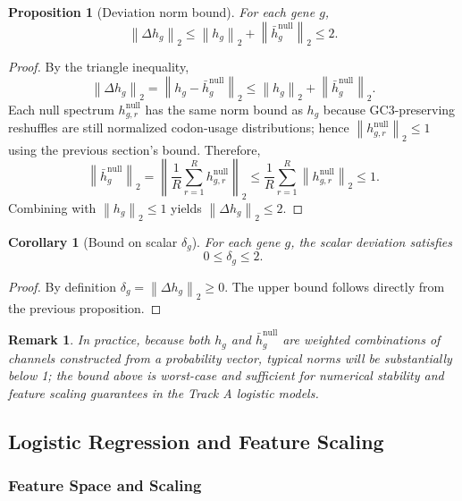 \documentclass[11pt]{article}
\newtheorem{proposition}[definition]{Proposition}
\newtheorem{corollary}[definition]{Corollary}
\newtheorem{remark}[definition]{Remark}
\newcommand{\norm}[1]{\left\lVert #1 \right\rVert}
\begin{document}
\begin{proposition}[Deviation norm bound]
For each gene \(g\),
\[
  \norm{\Delta h_g}_2 \le \norm{h_g}_2 + \norm{\bar{h}_g^{\mathrm{null}}}_2 \le 2.
\]
\end{proposition}

\begin{proof}
By the triangle inequality,
\[
  \norm{\Delta h_g}_2 = \norm{h_g - \bar{h}_g^{\mathrm{null}}}_2 \le \norm{h_g}_2 + \norm{\bar{h}_g^{\mathrm{null}}}_2.
\]
Each null spectrum \(h_{g,r}^{\mathrm{null}}\) has the same norm bound as \(h_g\) because GC3-preserving reshuffles are still normalized codon-usage distributions; hence \(\norm{h_{g,r}^{\mathrm{null}}}_2 \le 1\) using the previous section's bound.
Therefore,
\[
  \norm{\bar{h}_g^{\mathrm{null}}}_2 =
  \left\lVert \frac{1}{R} \sum_{r=1}^R h_{g,r}^{\mathrm{null}} \right\rVert_2
  \le \frac{1}{R} \sum_{r=1}^R \norm{h_{g,r}^{\mathrm{null}}}_2
  \le 1.
\]
Combining with \(\norm{h_g}_2 \le 1\) yields \(\norm{\Delta h_g}_2 \le 2\).
\end{proof}

\begin{corollary}[Bound on scalar \texorpdfstring{$\delta_g$}{δg}]
For each gene \(g\), the scalar deviation satisfies
\[
  0 \le \delta_g \le 2.
\]
\end{corollary}

\begin{proof}
By definition \(\delta_g = \norm{\Delta h_g}_2 \ge 0\).
The upper bound follows directly from the previous proposition.
\end{proof}

\begin{remark}
In practice, because both \(h_g\) and \(\bar{h}_g^{\mathrm{null}}\) are weighted combinations of channels constructed from a probability vector, typical norms will be substantially below 1; the bound above is worst-case and sufficient for numerical stability and feature scaling guarantees in the Track A logistic models.
\end{remark}

\subsection{Logistic Regression and Feature Scaling}

\subsubsection{Feature Space and Scaling}
\end{document}
